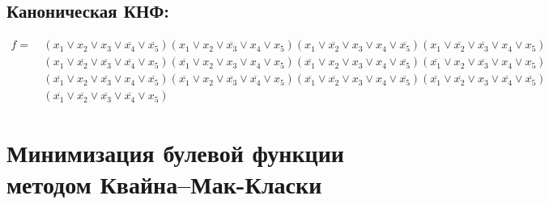 \documentclass{article}
\begin{document}
\subsection*{Каноническая КНФ:}
\begin{align*}
f =\: &\left(x_{1} \lor x_{2} \lor x_{3} \lor \overline{x_{4}} \lor \overline{x_{5}}\right)\left(x_{1} \lor x_{2} \lor \overline{x_{3}} \lor x_{4} \lor x_{5}\right)\left(x_{1} \lor \overline{x_{2}} \lor x_{3} \lor x_{4} \lor \overline{x_{5}}\right)\left(x_{1} \lor \overline{x_{2}} \lor \overline{x_{3}} \lor x_{4} \lor x_{5}\right)\\&\left(x_{1} \lor \overline{x_{2}} \lor \overline{x_{3}} \lor \overline{x_{4}} \lor x_{5}\right)\left(\overline{x_{1}} \lor x_{2} \lor x_{3} \lor x_{4} \lor x_{5}\right)\left(\overline{x_{1}} \lor x_{2} \lor x_{3} \lor x_{4} \lor \overline{x_{5}}\right)\left(\overline{x_{1}} \lor x_{2} \lor \overline{x_{3}} \lor x_{4} \lor x_{5}\right)\\&\left(\overline{x_{1}} \lor x_{2} \lor \overline{x_{3}} \lor x_{4} \lor \overline{x_{5}}\right)\left(\overline{x_{1}} \lor x_{2} \lor \overline{x_{3}} \lor \overline{x_{4}} \lor x_{5}\right)\left(\overline{x_{1}} \lor \overline{x_{2}} \lor x_{3} \lor x_{4} \lor \overline{x_{5}}\right)\left(\overline{x_{1}} \lor \overline{x_{2}} \lor x_{3} \lor \overline{x_{4}} \lor \overline{x_{5}}\right)\\&\left(\overline{x_{1}} \lor \overline{x_{2}} \lor \overline{x_{3}} \lor \overline{x_{4}} \lor x_{5}\right)\end{align*}
\section*{Минимизация булевой функции методом Квайна--Мак-Класки}
\end{document}
